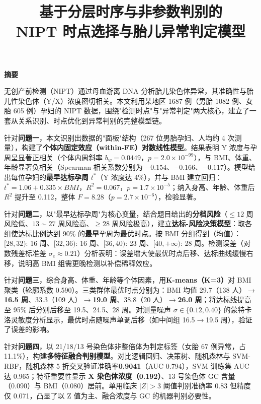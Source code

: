 \documentclass[12pt,a4paper]{article}
\title{\textbf{基于分层时序与非参数判别的\\ NIPT 时点选择与胎儿异常判定模型}}
\author{}
\date{}
\begin{document}
\maketitle
\vspace{-1.5em}

\begin{center}
\textbf{\large 摘要}
\end{center}
无创产前检测（NIPT）通过母血游离 DNA 分析胎儿染色体异常，其准确性与胎儿性染色体（Y/X）浓度密切相关。本文利用某地区 1687 例（男胎 1082 例、女胎 605 例）孕妇的 NIPT 数据，围绕"检测时点"与"异常判定"两大核心，建立了一套从关系识别、时点优化到异常判别的完整模型链。

针对\textbf{问题一}，本文识别出数据的"面板"结构（267 位男胎孕妇、人均约 4 次测量），构建了\textbf{个体内固定效应（within-FE）对数线性模型}。结果表明 Y 浓度与孕周呈显著正相关（个体内周斜率 $b_w=0.0449$，$p=2.0\times10^{-99}$），与 BMI、体重、年龄显著负相关（Spearman 相关系数分别为 $-0.154$、$-0.166$、$-0.117$）。模型给出每位孕妇的\textbf{最早达标孕周} $t^*$（Y 浓度达 4\%），并与 BMI 建立回归：$t^*=1.06+0.335\times BMI$，$R^2=0.067$，$p=1.7\times10^{-5}$；纳入身高、年龄、体重后 $R^2$ 提升至 0.112，整体 $F=8.28$（$p=2.7\times10^{-6}$），检验显著。

针对\textbf{问题二}，以"最早达标孕周"为核心变量，结合题目给出的\textbf{分档风险}（$\leq12$ 周风险低、$13\sim27$ 周风险高、$\geq28$ 周风险极高），建立\textbf{达标-风险决策模型}：取各组使达标比例达到 90\% 的\textbf{最早}孕周为最优时点。按 BMI 分组得到（均值）：$[28,32)$: 16 周、$[32,36)$: 16 周、$[36,40)$: 23 周、$[40,+\infty)$: 28 周。检测误差（对数残差标准差 $\sigma_e\approx0.21$）分析表明：误差增大使最优时点后移、达标曲线缓慢右移，说明高 BMI 组需更晚检测以补偿稀释效应。

针对\textbf{问题三}，综合身高、体重、年龄等个体因素，用\textbf{K-means（K=3）}对 BMI 聚类（轮廓系数 0.590）。三类群体最优时点分别为：BMI 均值 29.7（138 人）$\to$\textbf{16.5 周}、33.3（109 人）$\to$\textbf{19.0 周}、38.8（20 人）$\to$\textbf{26.0 周}；将达标线提高至 95\% 后分别后移至 19.5、24.5、28 周。对测量噪声 $\sigma\in\{0.12,0.40\}$ 的蒙特卡洛灵敏度分析显示，最优时点随噪声单调后移（如中间组 16.5$\to$19.5 周），验证了误差的影响。

针对\textbf{问题四}，以 21/18/13 号染色体非整倍体为判定标签（女胎 67 例异常，占 11.1\%），构建\textbf{多特征融合判别模型}。对比逻辑回归、决策树、随机森林与 SVM-RBF，随机森林 5 折交叉验证准确率\textbf{0.9041}（AUC 0.794），SVM 训练集 AUC 达 0.965；特征重要性显示 \textbf{X 染色体浓度（0.192）}、13 号染色体 GC 含量（0.090）与 BMI（0.080）居前。单用临床 $|Z|>3$ 阈值判别准确率 0.83 但精度仅 0.071，凸显了以 Z 值为主、融合浓度与 GC 的机器判别必要性。
\end{document}
